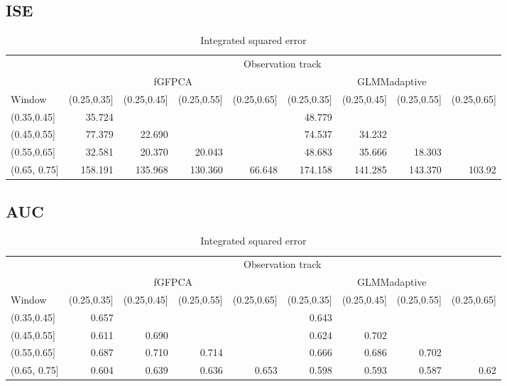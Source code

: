 \documentclass[
]{article}
\begin{document}
\hypertarget{ise-1}{%
\subsection{ISE}\label{ise-1}}

\begin{table}

\caption{\label{tab:unnamed-chunk-8}Integrated squared error}
\centering
\begin{tabular}[t]{l|r|r|r|r|r|r|r|r}
\hline
\multicolumn{1}{c|}{ } & \multicolumn{8}{c}{Observation track} \\
\cline{2-9}
\multicolumn{1}{c|}{ } & \multicolumn{4}{c|}{fGFPCA} & \multicolumn{4}{c}{GLMMadaptive} \\
\cline{2-5} \cline{6-9}
Window & (0.25,0.35] & (0.25,0.45] & (0.25,0.55] & (0.25,0.65] & (0.25,0.35] & (0.25,0.45] & (0.25,0.55] & (0.25,0.65]\\
\hline
(0.35,0.45] & 35.724 &  &  &  & 48.779 &  &  & \\
\hline
(0.45,0.55] & 77.379 & 22.690 &  &  & 74.537 & 34.232 &  & \\
\hline
(0.55,0.65] & 32.581 & 20.370 & 20.043 &  & 48.683 & 35.666 & 18.303 & \\
\hline
(0.65, 0.75] & 158.191 & 135.968 & 130.360 & 66.648 & 174.158 & 141.285 & 143.370 & 103.92\\
\hline
\end{tabular}
\end{table}

\hypertarget{auc-1}{%
\subsection{AUC}\label{auc-1}}

\begin{table}

\caption{\label{tab:unnamed-chunk-9}Integrated squared error}
\centering
\begin{tabular}[t]{l|r|r|r|r|r|r|r|r}
\hline
\multicolumn{1}{c|}{ } & \multicolumn{8}{c}{Observation track} \\
\cline{2-9}
\multicolumn{1}{c|}{ } & \multicolumn{4}{c|}{fGFPCA} & \multicolumn{4}{c}{GLMMadaptive} \\
\cline{2-5} \cline{6-9}
Window & (0.25,0.35] & (0.25,0.45] & (0.25,0.55] & (0.25,0.65] & (0.25,0.35] & (0.25,0.45] & (0.25,0.55] & (0.25,0.65]\\
\hline
(0.35,0.45] & 0.657 &  &  &  & 0.643 &  &  & \\
\hline
(0.45,0.55] & 0.611 & 0.690 &  &  & 0.624 & 0.702 &  & \\
\hline
(0.55,0.65] & 0.687 & 0.710 & 0.714 &  & 0.666 & 0.686 & 0.702 & \\
\hline
(0.65, 0.75] & 0.604 & 0.639 & 0.636 & 0.653 & 0.598 & 0.593 & 0.587 & 0.62\\
\hline
\end{tabular}
\end{table}
\end{document}
